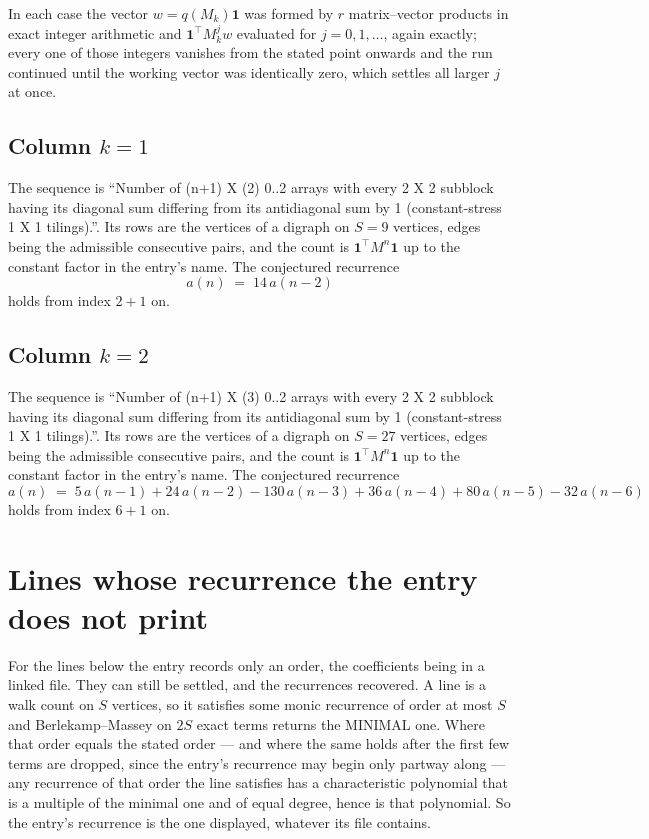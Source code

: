 \documentclass[11pt,a4paper]{article}
\theoremstyle{plain}
\theoremstyle{definition}
\begin{document}
In each case the vector $w=q(M_k)\mathbf{1}$ was formed by $r$ matrix--vector products in
exact integer arithmetic and $\mathbf{1}^{\!\top}M_k^{j}w$ evaluated for $j=0,1,\dots$,
again exactly; every one of those integers vanishes from the stated point onwards and the run
continued until the working vector was identically zero, which settles all larger $j$ at once.

\subsection*{Column $k$$=1$}
The sequence is ``Number of (n+1) X (2) 0..2 arrays with every 2 X 2 subblock having its diagonal sum differing from its antidiagonal sum by 1 (constant-stress 1 X 1 tilings).''. Its rows are the vertices of a digraph on
$S=9$ vertices, edges being the admissible consecutive pairs, and the count is
$\mathbf{1}^{\!\top}M^{n}\mathbf{1}$ up to the constant factor in the entry's name.
The conjectured recurrence
\[
a(n)\;=\;14\,a(n-2)
\]
holds from index $2+1$ on.

\subsection*{Column $k$$=2$}
The sequence is ``Number of (n+1) X (3) 0..2 arrays with every 2 X 2 subblock having its diagonal sum differing from its antidiagonal sum by 1 (constant-stress 1 X 1 tilings).''. Its rows are the vertices of a digraph on
$S=27$ vertices, edges being the admissible consecutive pairs, and the count is
$\mathbf{1}^{\!\top}M^{n}\mathbf{1}$ up to the constant factor in the entry's name.
The conjectured recurrence
\[
a(n)\;=\;5\,a(n-1) + 24\,a(n-2) - 130\,a(n-3) + 36\,a(n-4) + 80\,a(n-5) - 32\,a(n-6)
\]
holds from index $6+1$ on.


\section{Lines whose recurrence the entry does not print}

For the lines below the entry records only an order, the coefficients being in a linked file.
They can still be settled, and the recurrences recovered. A line is a walk count on $S$
vertices, so it satisfies some monic recurrence of order at most $S$ and Berlekamp--Massey on
$2S$ exact terms returns the MINIMAL one. Where that order equals the stated order --- and
where the same holds after the first few terms are dropped, since the entry's recurrence may
begin only partway along --- any recurrence of that order the line satisfies has a
characteristic polynomial that is a multiple of the minimal one and of equal degree, hence is
that polynomial. So the entry's recurrence is the one displayed, whatever its file contains.
\end{document}
